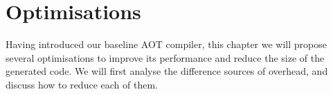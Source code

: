 \chapter{Optimisations}
\label{sec-optimisations}
Having introduced our baseline AOT compiler, this chapter we will propose several optimisations to improve its performance and reduce the size of the generated code. We will first analyse the difference sources of overhead, and discuss how to reduce each of them.

